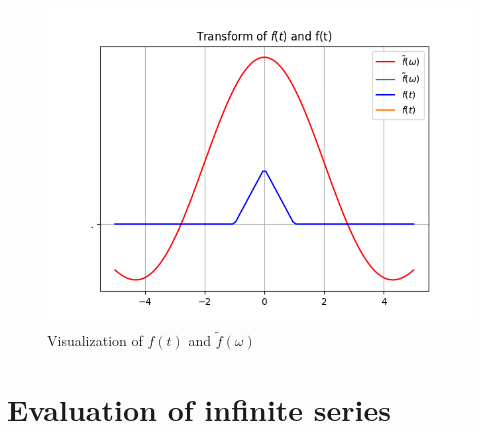 \documentclass{article}
\newcommand{\w}{\omega}
\begin{document}
\begin{figure}[H]
    \centering
    \includegraphics[scale = 0.4]{transform.png}
    \caption{Visualization of $f(t)$ and $\tilde{f}(\w)$}
    \label{fig: task1c}
\end{figure}
\section*{Evaluation of infinite series}
\end{document}
